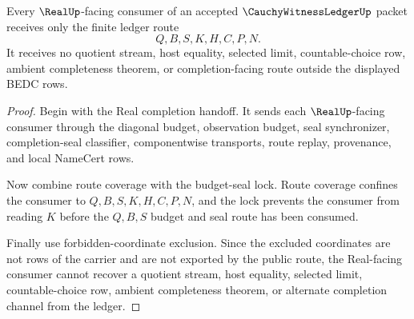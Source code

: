 \begin{theorem}
\label{thm:cauchy-witness-ledger-real-consumer-nonescape}
Every $\RealUp$-facing consumer of an accepted $\CauchyWitnessLedgerUp$ packet
receives only the finite ledger route
$$
Q,B,S,K,H,C,P,N.
$$
It receives no quotient stream, host equality, selected limit,
countable-choice row, ambient completeness theorem, or completion-facing route
outside the displayed BEDC rows.
\end{theorem}
\begin{proof}
Begin with the Real completion handoff. It sends each $\RealUp$-facing
consumer through the diagonal budget, observation budget, seal synchronizer,
completion-seal classifier, componentwise transports, route replay,
provenance, and local NameCert rows.

Now combine route coverage with the budget-seal lock. Route coverage confines
the consumer to $Q,B,S,K,H,C,P,N$, and the lock prevents the consumer from
reading $K$ before the $Q,B,S$ budget and seal route has been consumed.

Finally use forbidden-coordinate exclusion. Since the excluded coordinates are
not rows of the carrier and are not exported by the public route, the
Real-facing consumer cannot recover a quotient stream, host equality, selected
limit, countable-choice row, ambient completeness theorem, or alternate
completion channel from the ledger.
\end{proof}

